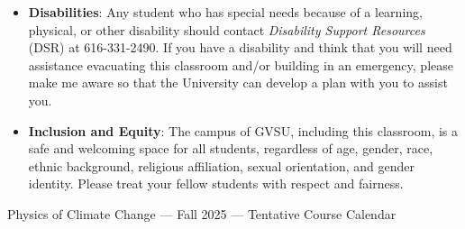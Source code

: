 \documentclass{article}
\begin{document}
\begin{itemize}
\item[] {\bf Disabilities}: Any student who has special needs because of a learning, physical, or other disability should contact {\em Disability Support Resources} (DSR) at 616-331-2490.  If you have a disability and think that you will need assistance evacuating this classroom and/or building in an emergency, please make me aware so that the University can develop a plan with you to assist you.

\item[] {\bf Inclusion and Equity}: The campus of GVSU, including this classroom, is a safe and welcoming space for all students, regardless of age, gender, race, ethnic background, religious affiliation, sexual orientation, and gender identity. Please treat your fellow students with respect and fairness.

\end{itemize}

\pagestyle{empty}
\newpage

\begin{center}
{\Large Physics of Climate Change --- Fall 2025 --- Tentative Course Calendar}
\end{center}
\end{document}
